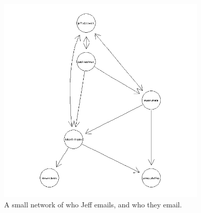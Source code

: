 \documentclass[12pt, a4paper, oneside]{amsart}
\begin{document}
\begin{figure}[htp]
\centering
\includegraphics[width = 100mm]{JeffPlot2.jpeg}
\caption{A small network of who Jeff emails, and who they email.}\label{fig:JeffNetwork}
\end{figure}\\
\end{document}
